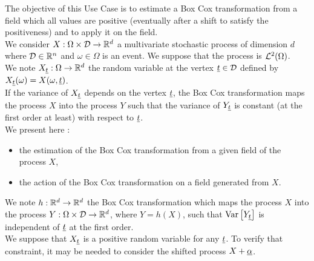 \renewcommand{\filename}{docUC_StocProc_BoxCox.tex}
\renewcommand{\filetitle}{UC : Box Cox transformation}

\HeaderIIILevel

\label{BoxCox}


The objective of this Use Case  is to estimate a Box Cox transformation from a field which all values are positive (eventually after a shift to satisfy the positiveness) and to apply it on the field.\\

We consider $X: \Omega \times {\mathcal D} \rightarrow {\mathbb R}^d$ a multivariate stochastic process of dimension $d$ where ${\mathcal D} \in {\mathbb R}^n$ and $\omega \in \Omega$ is an event. We suppose that the process is  ${\mathcal L}^2(\Omega)$.\\
We note $X_{{\underline{t}}}: \Omega \rightarrow {\mathbb R}^d$ the random variable at the vertex ${\underline{t}} \in {\mathcal D}$ defined by $X_{{\underline{t}}}(\omega)=X(\omega, {\underline{t}})$.\\

If the variance  of $X_{{\underline{t}}}$ depends on the vertex ${\underline{t}}$, the Box Cox transformation maps the process $X$ into the process $Y$ such that the variance of $Y_{{\underline{t}}}$ is constant (at the first order at least) with respect to ${\underline{t}}$.\\

We present here :
\begin{itemize}
\item the estimation of the Box Cox transformation from a given field of the process $X$,
\item the action of the Box Cox transformation on a field generated from $X$.
\end{itemize}

We note $h: {\mathbb R}^d \rightarrow {\mathbb R}^d$ the Box Cox transformation which maps the process $X$ into the process $Y: \Omega \times {\mathcal D} \rightarrow {\mathbb R}^d$, where $Y=h(X)$, such that  ${\rm Var}\left[ Y_{{\underline{t}}} \right]$ is independent of ${\underline{t}}$ at the first order.\\
We suppose that $X_{{\underline{t}}}$ is a positive random variable for any ${\underline{t}}$. To verify that constraint, it may be needed to consider the shifted process $X+{\underline{\alpha}}$. \\

